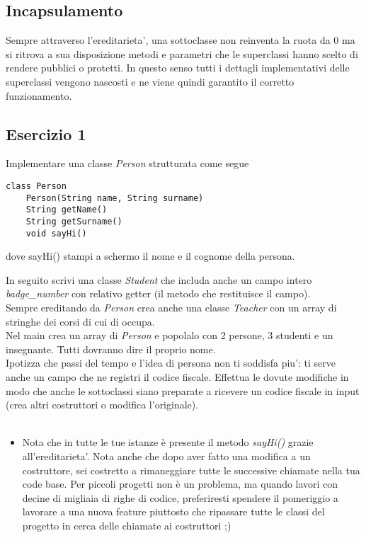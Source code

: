 \documentclass{article}
\begin{document}
\newpage

\subsection*{Incapsulamento}
Sempre attraverso l'ereditarieta', una sottoclasse non reinventa la ruota da 0
ma si ritrova a sua disposizione metodi e parametri che le superclassi hanno
scelto di rendere pubblici o protetti. In questo senso tutti i dettagli
implementativi delle superclassi vengono nascosti e ne viene quindi garantito il
corretto funzionamento.

\newpage

\subsection*{Esercizio 1}
Implementare una classe \textit{Person} strutturata come segue
\begin{verbatim}
class Person
    Person(String name, String surname)
    String getName()
    String getSurname()
    void sayHi()
\end{verbatim}
dove sayHi() stampi a schermo il nome e il cognome della persona.

In seguito scrivi una classe \textit{Student} che includa anche un campo intero
\textit{badge\_number} con relativo getter (il metodo che restituisce il
campo).\\
Sempre ereditando da \textit{Person} crea anche una classe \textit{Teacher} con
un array di stringhe dei corsi di cui di occupa. \\
Nel main crea un array di \textit{Person} e popolalo con 2 persone, 3 studenti e
un insegnante. Tutti dovranno dire il proprio nome. \\
Ipotizza che passi del tempo e l'idea di persona non ti soddisfa piu': ti serve
anche un campo che ne registri il codice fiscale. Effettua le dovute modifiche
in modo che anche le sottoclassi siano preparate a ricevere un codice fiscale in
input (crea altri costruttori o modifica l'originale). \\ \\
\begin{itemize}
    \item Nota che in tutte le tue istanze è presente il metodo \textit{sayHi()} grazie
all'ereditarieta'. Nota anche che dopo aver fatto una modifica a un costruttore,
sei costretto a rimaneggiare tutte le successive chiamate nella tua code base.
Per piccoli progetti non è un problema, ma quando lavori con decine di migliaia
di righe di codice, preferiresti spendere il pomeriggio a lavorare a una nuova
feature piuttosto che ripassare tutte le classi del progetto in cerca delle
chiamate ai costruttori ;)
\end{itemize}
\end{document}
